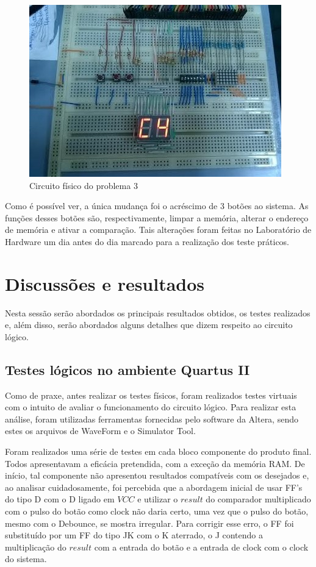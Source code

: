 \documentclass[12pt]{article}
\begin{document}
\begin{figure}[!htbp]
\centering
\begin{sideways}
\includegraphics[width=.6\textwidth]{img/circuito-p3.jpg}
\end{sideways}
\caption{Circuito físico do problema 3}
\label{fig:circuito-p3}
\end{figure}

Como é possível ver, a única mudança foi o acréscimo de 3 botões ao sistema. As funções desses botões são, respectivamente, limpar a memória, alterar o endereço de memória e ativar a comparação. Tais alterações foram feitas no Laboratório de Hardware um dia antes do dia marcado para a realização dos teste práticos.

\section{Discussões e resultados}

Nesta sessão serão abordados os principais resultados obtidos, os testes realizados e, além disso, serão abordados alguns detalhes que dizem respeito ao circuito lógico.

\subsection{Testes lógicos no ambiente Quartus II}

Como de praxe, antes realizar os testes físicos, foram realizados testes virtuais com o intuito de avaliar o funcionamento do circuito lógico.  Para realizar esta análise, foram utilizadas ferramentas fornecidas pelo software da Altera, sendo estes os arquivos de WaveForm e o Simulator Tool.

Foram realizados uma série de testes em cada bloco componente do produto final. Todos apresentavam a eficácia pretendida, com a exceção da memória RAM. De início, tal componente não apresentou resultados compatíveis com os desejados e, ao analisar cuidadosamente, foi percebida que a abordagem inicial de usar FF's do tipo D com o D ligado em $VCC$ e utilizar o $result$ do comparador multiplicado com o pulso do botão como clock não daria certo, uma vez que o pulso do botão, mesmo com o Debounce, se mostra irregular. Para corrigir esse erro, o FF foi substituído por um FF do tipo JK com o K aterrado, o J contendo a multiplicação do $result$ com a entrada do botão e a entrada de clock com o clock do sistema. 
\end{document}
